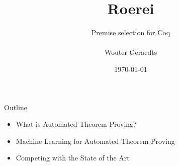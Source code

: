 \documentclass[department=ds, notes={hide notes}, slidesperpage=1]{beamerruhuisstijl}
\title{Roerei}
\subtitle{
	Premise selection for Coq\\
	\\
	Wouter Geraedts
}
\date{\today}
\begin{document}
\renewcommand{\dept}{icis}
\begin{frame}
	\titlepage
\end{frame}

\begin{frame}{Outline}
	\begin{itemize}
		\item What is Automated Theorem Proving?
		\item Machine Learning for Automated Theorem Proving
		\item Competing with the State of the Art
	\end{itemize}
\end{frame}



\end{document}
